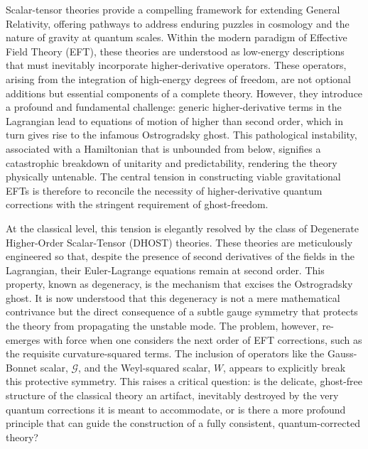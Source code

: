 \documentclass[twocolumn]{aastex631}
\begin{document}
Scalar-tensor theories provide a compelling framework for extending General Relativity, offering pathways to address enduring puzzles in cosmology and the nature of gravity at quantum scales. Within the modern paradigm of Effective Field Theory (EFT), these theories are understood as low-energy descriptions that must inevitably incorporate higher-derivative operators. These operators, arising from the integration of high-energy degrees of freedom, are not optional additions but essential components of a complete theory. However, they introduce a profound and fundamental challenge: generic higher-derivative terms in the Lagrangian lead to equations of motion of higher than second order, which in turn gives rise to the infamous Ostrogradsky ghost. This pathological instability, associated with a Hamiltonian that is unbounded from below, signifies a catastrophic breakdown of unitarity and predictability, rendering the theory physically untenable. The central tension in constructing viable gravitational EFTs is therefore to reconcile the necessity of higher-derivative quantum corrections with the stringent requirement of ghost-freedom.

At the classical level, this tension is elegantly resolved by the class of Degenerate Higher-Order Scalar-Tensor (DHOST) theories. These theories are meticulously engineered so that, despite the presence of second derivatives of the fields in the Lagrangian, their Euler-Lagrange equations remain at second order. This property, known as degeneracy, is the mechanism that excises the Ostrogradsky ghost. It is now understood that this degeneracy is not a mere mathematical contrivance but the direct consequence of a subtle gauge symmetry that protects the theory from propagating the unstable mode. The problem, however, re-emerges with force when one considers the next order of EFT corrections, such as the requisite curvature-squared terms. The inclusion of operators like the Gauss-Bonnet scalar, $\mathcal{G}$, and the Weyl-squared scalar, $W$, appears to explicitly break this protective symmetry. This raises a critical question: is the delicate, ghost-free structure of the classical theory an artifact, inevitably destroyed by the very quantum corrections it is meant to accommodate, or is there a more profound principle that can guide the construction of a fully consistent, quantum-corrected theory?
\end{document}
